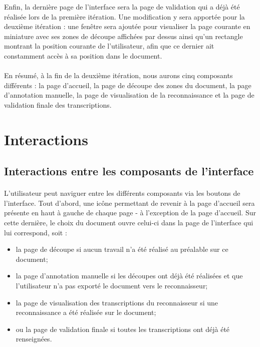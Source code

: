 
Enfin, la dernière page de l’interface sera la page de validation qui a déjà été réalisée lors de la première itération. Une modification y sera apportée pour la deuxième itération : une fenêtre sera ajoutée pour visualiser la page courante en miniature avec ses zones de découpe affichées par dessus ainsi qu’un rectangle montrant la position courante de l’utilisateur, afin que ce dernier ait constamment accès à sa position dans le document.


\paragraph{}
En résumé, à la fin de la deuxième itération, nous aurons cinq composants différents : la page d’accueil, la page de découpe des zones du document, la page d’annotation manuelle, la page de visualisation de la reconnaissance et la page de validation finale des transcriptions.


\section{Interactions}

\subsection{Interactions entre les composants de l'interface}

\paragraph{}
L’utilisateur peut naviguer entre les différents composants via les boutons de l’interface.
Tout d’abord, une icône permettant de revenir à la page d’accueil sera présente en haut à gauche de chaque page - à l’exception de la page d’accueil. Sur cette dernière, le choix du document ouvre celui-ci dans la page de l’interface qui lui correspond, soit :

\begin{itemize}[noitemsep]
\item la page de découpe si aucun travail n’a été réalisé au préalable sur ce document;
\item la page d’annotation manuelle si les découpes ont déjà été réalisées et que l’utilisateur n’a pas exporté le document vers le reconnaisseur;
\item la page de visualisation des transcriptions du reconnaisseur si une reconnaissance a été réalisée sur le document;
\item ou la page de validation finale si toutes les transcriptions ont déjà été renseignées.
\end{itemize}

